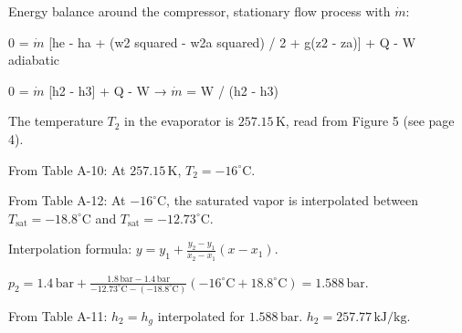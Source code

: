 Energy balance around the compressor, stationary flow process with \( \dot{m} \):  

0 = \( \dot{m} \) [he - ha + (w2 squared - w2a squared) / 2 + g(z2 - za)] + Q - W  
adiabatic  

0 = \( \dot{m} \) [h2 - h3] + Q - W → \( \dot{m} \) = W / (h2 - h3)

The temperature \( T_2 \) in the evaporator is \( 257.15 \, \text{K} \), read from Figure 5 (see page 4).  

From Table A-10:  
At \( 257.15 \, \text{K} \), \( T_2 = -16^\circ \text{C} \).  

From Table A-12:  
At \( -16^\circ \text{C} \), the saturated vapor is interpolated between \( T_{\text{sat}} = -18.8^\circ \text{C} \) and \( T_{\text{sat}} = -12.73^\circ \text{C} \).  

Interpolation formula:  
\( y = y_1 + \frac{y_2 - y_1}{x_2 - x_1} (x - x_1) \).  

\( p_2 = 1.4 \, \text{bar} + \frac{1.8 \, \text{bar} - 1.4 \, \text{bar}}{-12.73^\circ \text{C} - (-18.8^\circ \text{C})} (-16^\circ \text{C} + 18.8^\circ \text{C}) = 1.588 \, \text{bar} \).  

From Table A-11:  
\( h_2 = h_g \) interpolated for \( 1.588 \, \text{bar} \).  
\( h_2 = 257.77 \, \text{kJ/kg} \).